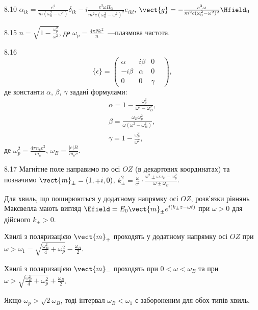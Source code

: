 \protect \section *{}
\begin{Solution}{8.{10}}
	$\alpha_{ik} = \frac{e^2}{m(\omega_0^2 - \omega^2)}\delta_{ik} - i \frac{e^3\omega H_{0l}}{m^2c(\omega_0^2 - \omega^2)^2}e_{ikl}$, $\vect{g} = -\frac{e^3\omega}{m^2c(\omega_0^2 - \omega^2)^2}\Hfield_0$
\end{Solution}
\begin{Solution}{8.{15}}
	$n = \sqrt{1 - \frac{\omega_p^2}{\omega^2}}$, де $\omega_p = \frac{4\pi N e^2}{n}$~---плазмова частота.
\end{Solution}
\begin{Solution}{8.{16}}
	\begin{equation*}
		\{ \epsilon \}  = \left( {\begin{array}{*{20}{c}}
				\alpha       & {i\beta } & 0      & \\
				{ - i\beta } & \alpha    & 0      & \\
				0            & 0         & \gamma &
			\end{array}} \right),
	\end{equation*}
	де константи $\alpha$, $\beta$, $\gamma$ задані формулами:
	\begin{align*}
		\alpha =  1 - \frac{\omega_p^2}{\omega ^2 - \omega _B^2},           \\
		\beta = \frac{\omega_B\omega_p^2}{\omega(\omega ^2 - \omega _B^2)}, \\
		\gamma = 1 - \frac{\omega _p^2}{\omega ^2},
	\end{align*}
	де $\omega _p^2 = \frac{4\pi n_e e^2}{m_e}$, $\omega_B = \frac{\left| e \right|B}{m_ec}$.
\end{Solution}
\begin{Solution}{8.{17}}
    Магнітне поле направимо по осі $OZ$ (в декартових координатах) та позначимо \(\vect{m}_{\pm} = (1, \mp i,0)\), \(k_\pm^2 = \frac{\omega }{c^2} \cdot \frac{\omega^2 \pm \omega \omega_B - \omega_p^2}{\omega  \pm \omega_B}\).

    Для хвиль, що поширюються у додатному напрямку осі $OZ$, розв’язки рівнянь Максвелла мають вигляд $\Efield = E_0\vect{m}_{\pm} e^{i(k_\pm z - \omega t)}$ при $\omega > 0$ для дійсного $k_{\pm} >0$.

    Хвилі з поляризацією $\vect{m}_+$ проходять у додатному напрямку осі $OZ$ при \(\omega  > \omega_1 = \sqrt {\frac{{\omega_B^2}}{4} + \omega_p^2}  - \frac{\omega _B}{2}\).

    Хвилі з поляризацією $\vect{m}_-$ проходять при \(0<\omega<\omega_B\)  та при\\\(\omega  > \sqrt {\frac{\omega_B^2}{4} + \omega_p^2}  + \frac{\omega _B}{2}\).

    Якщо \({\omega _p} > \sqrt 2 {\omega _B}\), тоді  інтервал \(\omega_B  <  \omega_1 \)  є забороненим для обох типів хвиль.
\end{Solution}
